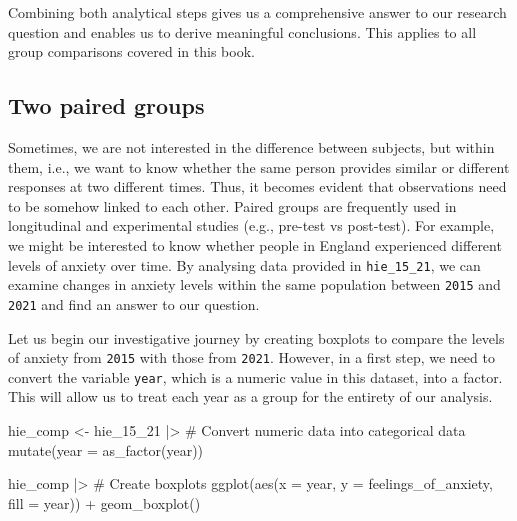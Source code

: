 \documentclass[
  letterpaper,
]{krantz}
\makeatletter
\newenvironment{Shaded}{\begin{snugshade}}{\end{snugshade}}
\newcommand{\AttributeTok}[1]{\textcolor[rgb]{0.40,0.45,0.13}{#1}}
\newcommand{\CommentTok}[1]{\textcolor[rgb]{0.37,0.37,0.37}{#1}}
\newcommand{\FunctionTok}[1]{\textcolor[rgb]{0.28,0.35,0.67}{#1}}
\newcommand{\NormalTok}[1]{\textcolor[rgb]{0.00,0.23,0.31}{#1}}
\newcommand{\OtherTok}[1]{\textcolor[rgb]{0.00,0.23,0.31}{#1}}
\newcommand{\SpecialCharTok}[1]{\textcolor[rgb]{0.37,0.37,0.37}{#1}}
\newenvironment{kframe}{%
\medskip{}
\setlength{\fboxsep}{.8em}
 \def\at@end@of@kframe{}%
 \ifinner\ifhmode%
  \def\at@end@of@kframe{\end{minipage}}%
  \begin{minipage}{\columnwidth}%
 \fi\fi%
 \def\FrameCommand##1{\hskip\@totalleftmargin \hskip-\fboxsep
 \colorbox{shadecolor}{##1}\hskip-\fboxsep
     \hskip-\linewidth \hskip-\@totalleftmargin \hskip\columnwidth}%
 \MakeFramed {\advance\hsize-\width
   \@totalleftmargin\z@ \linewidth\hsize
   \@setminipage}}%
 {\par\unskip\endMakeFramed%
 \at@end@of@kframe}
\renewenvironment{Shaded}{\begin{kframe}}{\end{kframe}}
\makeatother
\begin{document}
Combining both analytical steps gives us a comprehensive answer to our
research question and enables us to derive meaningful conclusions. This
applies to all group comparisons covered in this book.

\subsection{Two paired groups}\label{sec-two-paired-groups}

Sometimes, we are not interested in the difference between subjects, but
within them, i.e., we want to know whether the same person provides
similar or different responses at two different times. Thus, it becomes
evident that observations need to be somehow linked to each other.
Paired groups are frequently used in longitudinal and experimental
studies (e.g., pre-test vs post-test). For example, we might be
interested to know whether people in England experienced different
levels of anxiety over time. By analysing data provided in
\texttt{hie\_15\_21}, we can examine changes in anxiety levels within
the same population between \texttt{2015} and \texttt{2021} and find an
answer to our question.

Let us begin our investigative journey by creating boxplots to compare
the levels of anxiety from \texttt{2015} with those from \texttt{2021}.
However, in a first step, we need to convert the variable \texttt{year},
which is a numeric value in this dataset, into a factor. This will allow
us to treat each year as a group for the entirety of our analysis.

\begin{Shaded}
\begin{Highlighting}[]
\NormalTok{hie\_comp }\OtherTok{\textless{}{-}}
\NormalTok{  hie\_15\_21 }\SpecialCharTok{|\textgreater{}}
  \CommentTok{\# Convert numeric data into categorical data}
  \FunctionTok{mutate}\NormalTok{(}\AttributeTok{year =} \FunctionTok{as\_factor}\NormalTok{(year))}

\NormalTok{hie\_comp }\SpecialCharTok{|\textgreater{}}  
  \CommentTok{\# Create boxplots}
  \FunctionTok{ggplot}\NormalTok{(}\FunctionTok{aes}\NormalTok{(}\AttributeTok{x =}\NormalTok{ year,}
             \AttributeTok{y =}\NormalTok{ feelings\_of\_anxiety,}
             \AttributeTok{fill =}\NormalTok{ year)) }\SpecialCharTok{+}
  \FunctionTok{geom\_boxplot}\NormalTok{()}
\end{Highlighting}
\end{Shaded}
\end{document}
